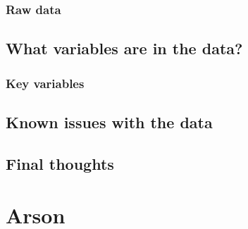 \documentclass[
  12pt,
  openany]{book}
\begin{document}
\hypertarget{raw-data-3}{%
\subsection{Raw data}\label{raw-data-3}}

\hypertarget{what-variables-are-in-the-data-5}{%
\section{What variables are in the data?}\label{what-variables-are-in-the-data-5}}

\hypertarget{key-variables-5}{%
\subsection{Key variables}\label{key-variables-5}}

\hypertarget{known-issues-with-the-data-5}{%
\section{Known issues with the data}\label{known-issues-with-the-data-5}}

\hypertarget{final-thoughts-5}{%
\section{Final thoughts}\label{final-thoughts-5}}

\hypertarget{arson-1}{%
\chapter{Arson}\label{arson-1}}
\end{document}
